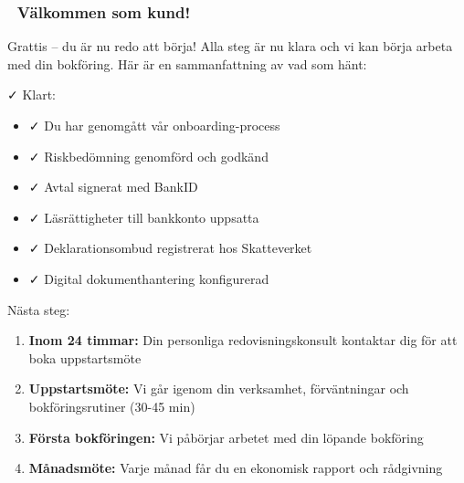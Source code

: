 \documentclass[10pt]{beamer}
\begin{document}
\begin{frame}[fragile]
  \frametitle{🎉 Välkommen som kund!}

  \begin{block}{Grattis – du är nu redo att börja!}
    \vspace{0.2cm}
    Alla steg är nu klara och vi kan börja arbeta med din bokföring.
    Här är en sammanfattning av vad som hänt:
  \end{block}

  \vspace{0.4cm}

  \begin{block}{✓ Klart:}
    \footnotesize
    \begin{itemize}
      \item ✓ Du har genomgått vår onboarding-process
      \item ✓ Riskbedömning genomförd och godkänd
      \item ✓ Avtal signerat med BankID
      \item ✓ Läsrättigheter till bankkonto uppsatta
      \item ✓ Deklarationsombud registrerat hos Skatteverket
      \item ✓ Digital dokumenthantering konfigurerad
    \end{itemize}
  \end{block}

  \vspace{0.4cm}

  \begin{block}{Nästa steg:}
    \footnotesize
    \begin{enumerate}
      \item \textbf{Inom 24 timmar:} Din personliga redovisningskonsult kontaktar dig för att boka uppstartsmöte
      \item \textbf{Uppstartsmöte:} Vi går igenom din verksamhet, förväntningar och bokföringsrutiner (30-45 min)
      \item \textbf{Första bokföringen:} Vi påbörjar arbetet med din löpande bokföring
      \item \textbf{Månadsmöte:} Varje månad får du en ekonomisk rapport och rådgivning
    \end{enumerate}
  \end{block}


\end{frame}
\end{document}
